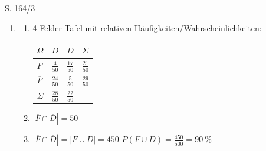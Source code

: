 \begin{Exercise}{S. 164/3}{}
\begin{enumerate}[leftmargin=*]
    \item [3.]\begin{enumerate}[label=\alph*),leftmargin=*]
        \item[a)] {
            \begin{minipage}[t]{0.35\linewidth}
            4-Felder Tafel mit relativen Häufigkeiten/Wahrscheinlichkeiten:
            \end{minipage}
            \hfill
            \begin{minipage}[t]{0.6\linewidth}
            \renewcommand{\arraystretch}{1.2}
            \begin{tabularx}{0.8\linewidth}[t]{@{} Y|Y|Y|Y @{}}
                $\Omega$ & $D$ & $\overline{D}$ & $\Sigma$ \\ \hline
                $F$ & $\frac{4}{50}$ & $\frac{17}{50}$ &  $\frac{21}{50}$\\ \hline
                $\overline{F}$ & $\frac{24}{50}$ & $\frac{5}{50}$ & $\frac{29}{50}$ \\ \hline
                $\Sigma$ & $\frac{28}{50}$ & $\frac{22}{50}$ & 
            \end{tabularx}
            \end{minipage}
            }
        \item [b)] {
            $\left|\overline{F} \cap \overline{D}\right| = 50$
            }
        \item [c)] {
            $\left|\overline{F} \cap \overline{D}\right| = \left|F \cup D\right| = 450$ \qquad $P(F \cup D) = \frac{450}{500} = \SI{90}{\%}$
            }
    \end{enumerate}
\end{enumerate}
\end{Exercise}